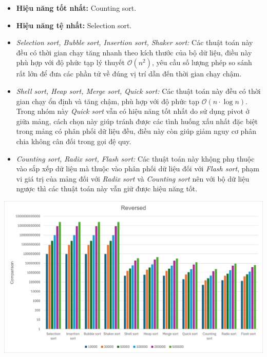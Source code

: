     \begin{itemize}
        \item \textbf{Hiệu năng tốt nhất:} Counting sort.
        \item \textbf{Hiệu năng tệ nhất:} Selection sort.
        \item \textit{Selection sort, Bubble sort, Insertion sort, Shaker sort:} Các thuật toán này đều có thời gian chạy tăng nhanh theo kích thước của bộ dữ liệu, điều này phù hợp với độ phức tạp lý thuyết $\mathcal{O}(n^2)$, yêu cầu số lượng phép so sánh rất lớn để đưa các phần tử về đúng vị trí dẫn đến thời gian chạy chậm.
        \item \textit{Shell sort, Heap sort, Merge sort, Quick sort:} Các thuật toán này đều có thời gian chạy ổn định và tăng chậm, phù hợp với độ phức tạp $\mathcal{O}(n \cdot \log n)$. Trong nhóm này \textit{Quick sort} vẫn có hiệu năng tốt nhất do sử dụng pivot ở giữa mảng, cách chọn này giúp tránh được các tình huống xấu nhất đặc biệt trong mảng có phân phối dữ liệu đều, điều này còn giúp giảm nguy cơ phân chia không cân đối trong gọi đệ quy.
        \item \textit{Counting sort, Radix sort, Flash sort:} Các thuật toán này khộng phụ thuộc vào sắp xếp dữ liệu mà thuộc vào phân phối dữ liệu đối với \textit{Flash sort}, phạm vi giá trị của mảng đối với \textit{Radix sort} và \textit{Counting sort} nên với bộ dữ liệu ngược thì các thuật toán này vẫn giữ được hiệu năng tốt.
    \end{itemize}

    \includegraphics[width = 1\linewidth]{img/experiment/comparison/reversed.png}

